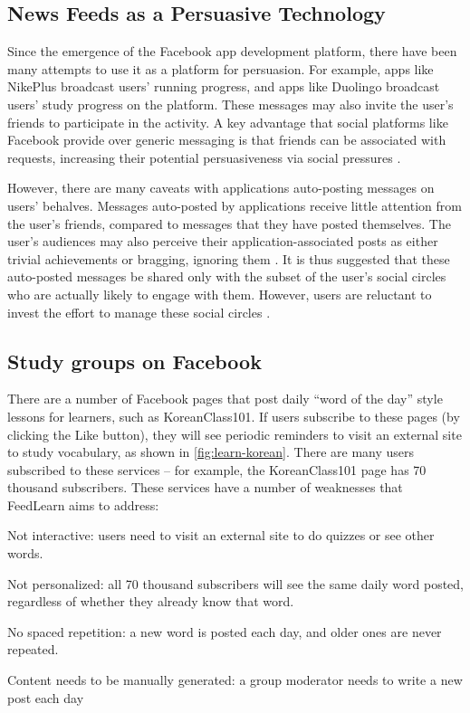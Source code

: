 \documentclass{chi-ext}
\begin{document}
\subsection{News Feeds as a Persuasive Technology}

Since the emergence of the Facebook app development platform, there have been
many attempts to use it as a platform for persuasion. For example, apps like NikePlus broadcast users' running progress, and apps like Duolingo broadcast users' study progress on the platform. These messages may also invite the user's friends to participate in the activity. A key advantage that social platforms like Facebook provide over generic messaging is that friends can be associated with requests, increasing their potential persuasiveness via social pressures \cite{foggfacebook}.

However, there are many caveats with applications auto-posting messages on users' behalves. Messages auto-posted by applications receive little attention from the user's friends, compared to messages that they have posted themselves. The user's audiences may also perceive their application-associated posts as either trivial achievements or bragging, ignoring them \cite{socialsharing}. It is thus suggested that these auto-posted messages be shared only with the subset of the user's social circles who are actually likely to engage with them. However, users are reluctant to invest the effort to manage these social circles \cite{socialsharing}.

\subsection{Study groups on Facebook}

There are a number of Facebook pages that post daily ``word of the day'' style lessons for learners, such as KoreanClass101. If users subscribe to these pages (by clicking the Like button), they will see periodic reminders to visit an external site to study vocabulary, as shown in \autoref{fig:learn-korean}. There are many users subscribed to these services -- for example, the KoreanClass101 page has 70 thousand subscribers. These services have a number of weaknesses that FeedLearn aims to address:

\begin{compactitem}
\item Not interactive: users need to visit an external site to do quizzes or see other words.
\item Not personalized: all 70 thousand subscribers will see the same daily word posted, regardless of whether they already know that word.
\item No spaced repetition: a new word is posted each day, and older ones are never repeated.
\item Content needs to be manually generated: a group moderator needs to write a new post each day
\end{compactitem}
\end{document}
